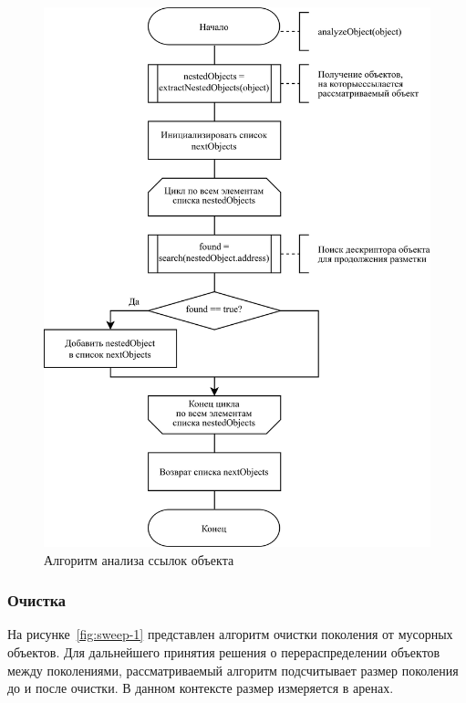 \begin{figure}[H]
	\centering
	\includegraphics[scale=0.185]{assets/mark-5.png}
	\caption{Алгоритм анализа ссылок объекта}
	\label{fig:mark-5}
\end{figure}

\subsubsection{Очистка}

На рисунке~\ref{fig:sweep-1} представлен алгоритм очистки поколения от мусорных объектов. Для дальнейшего принятия решения о перераспределении объектов между поколениями, рассматриваемый алгоритм подсчитывает размер поколения до и после очистки. В данном контексте размер измеряется в аренах.

